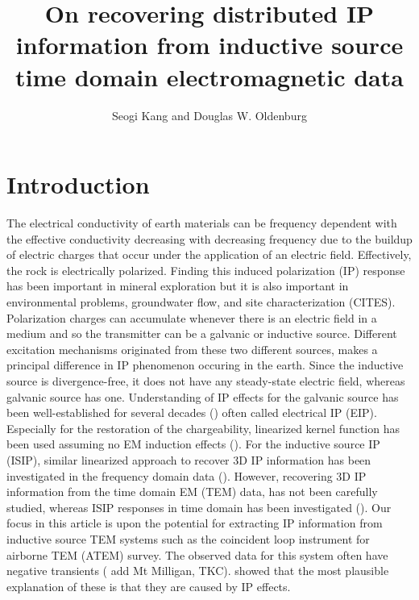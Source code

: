 \documentclass[a4paper, 11pt]{article}
\author{Seogi Kang and Douglas W. Oldenburg}
\title{On recovering distributed IP information from inductive source time domain electromagnetic data}
\begin{document}
\maketitle
\tableofcontents
\clearpage

\section{Introduction}
The electrical conductivity of earth materials can be frequency dependent with the effective conductivity decreasing with decreasing frequency due to the buildup of electric charges that occur under the application of an electric field.
Effectively, the rock is electrically polarized. Finding this induced polarization (IP) response has been important in mineral exploration but it is also important in environmental problems, groundwater flow, and site characterization (CITES). 
Polarization charges can accumulate whenever there is an electric field in a medium and so the transmitter can be a galvanic or inductive source. 
Different excitation mechanisms originated from these two different sources, makes a principal difference in IP phenomenon occuring in the earth. 
Since the inductive source is divergence-free, it does not have any steady-state electric field, whereas galvanic source has one. 
Understanding of IP effects for the galvanic source has been well-established for several decades (\cite{seigel1959}) often called electrical IP (EIP). Especially for the restoration of the chargeability, linearized kernel function has been used assuming no EM induction effects (\cite{doug1994}). For the inductive source IP (ISIP), similar linearized approach to recover 3D IP information has been investigated in the frequency domain data (\cite{Marchant2012b}). However, recovering 3D IP information from the time domain EM (TEM) data, has not been carefully studied, whereas ISIP responses in time domain has been investigated (\cite{Smith1988a,Flis1989,ElKaliouby2004, Marchant2014}).
Our focus in this article is upon the potential for extracting IP information from inductive source TEM systems such as the coincident loop instrument for airborne TEM (ATEM) survey. The observed data for this system often have negative transients (\cite{Kratzer2012} add Mt Milligan, TKC). \cite{Weidelt1982} showed that the most plausible explanation of these is that they are caused by IP effects. 
\end{document}
